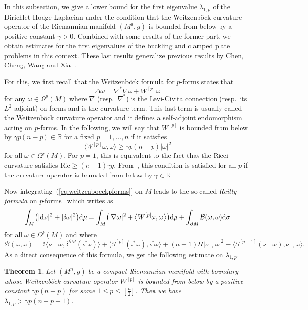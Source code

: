 \documentclass[10pt,a4paper]{amsart}
\numberwithin{equation}{section}
\newtheorem{Theorem}{Theorem}[section]
\theoremstyle{definition}
\begin{document}
In this subsection, we give a lower bound for the first eigenvalue $\lambda_{1,p}$ of the Dirichlet Hodge Laplacian under the condition that the Weitzenb\"ock curvature operator of the Riemannian manifold $(M^n,g)$ is bounded from below by a positive constant $\gamma>0$. Combined with some results of the former part, we obtain estimates for the first eigenvalues of the buckling and clamped plate problems in this context. These last results generalize previous results by Chen, Cheng, Wang and Xia~\cite{ChenChengWangXia2012}.

For this, we first recall that the Weitzenb\"ock formula for $p$-forms states that
\begin{equation}\label{eq:weitzenboeckpforms}
\Delta\omega=\nabla^*\nabla\omega+W^{[p]}\omega
\end{equation}
for any $\omega\in\Omega^p(M)$ where $\nabla$ (resp.\ $\nabla^*$) is the Levi-Civita connection \big(resp.\ its $L^2$-adjoint\big) on forms and  is the curvature term. This last term is usually called the Weitzenb\"ock curvature operator and it defines a self-adjoint endomorphism acting on $p$-forms.
In the following, we will say that $W^{[p]}$ is bounded from below by $\gamma p(n-p)\in\mathbb{R}$ for a fixed $p=1,\dots,n$ if it satisfies
\begin{equation}\label{BCOperator}
\bigl\langle W^{[p]}\omega,\omega\bigr\rangle\geq \gamma p(n-p)|\omega|^2
\end{equation}
for all $\omega\in\Omega^p(M)$.
For $p=1$, this is equivalent to the fact that the Ricci curvature satisfies $\mathrm{Ric}\geq (n-1)\gamma g$.
From~\cite{GM}, this condition is satisfied for all $p$ if the curvature operator is bounded from below by $\gamma\in\mathbb{R}$.

Now integrating~(\ref{eq:weitzenboeckpforms}) on $M$ leads to the so-called {\it Reilly formula} on $p$-forms~\cite[Theorem~3]{RaulotSavo2011} which writes as
\begin{equation}\label{eq:Reillyformula}
\int_M\bigl(|{\rm d}\omega|^2+|\delta\omega|^2\bigr){\rm d}\mu=\int_M\bigl(|\nabla\omega|^2+\bigl\langle W^{[p]}\omega,\omega\bigr\rangle\bigr){\rm d}\mu+\int_{\partial M}\mathcal{B}(\omega,\omega){\rm d}\sigma
\end{equation}
for all $\omega\in\Omega^p(M)$ and where
\[
\mathcal{B}(\omega,\omega)=2\bigl\langle\nu\lrcorner\omega,\delta^{\partial M}(\iota^*\omega)\bigr\rangle+\bigl\langle S^{[p]}(\iota^*\omega),\iota^*\omega\bigr\rangle+(n-1)H|\nu\lrcorner\omega|^2-\bigl\langle S^{[p-1]}(\nu\lrcorner\omega),\nu\lrcorner\omega\bigr\rangle.
\]
As a direct consequence of this formula, we get the following estimate on $\lambda_{1,p}$.
\begin{Theorem}\label{GM_Dirichlet}
Let $(M^n,g)$ be a compact Riemannian manifold with boundary whose Weitzen\-b\"ock curvature operator $W^{[p]}$ is bounded from below by a positive constant $\gamma p(n-p)$ for some $1\leq p\leq [\frac{n}{2}]$.
Then we have $\lambda_{1,p}>\gamma p(n-p+1)$.
\end{Theorem}
\end{document}
